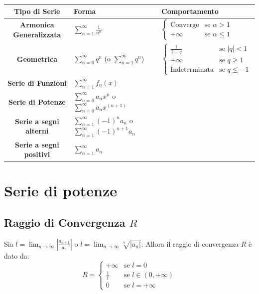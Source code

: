 \documentclass[10pt, a4paper]{article}
\begin{document}
    \begin{center}
        \begin{tabular}{|c|p{6cm}|p{5cm}|}
            \hline
            \textbf{Tipo di Serie} & \textbf{Forma} & \textbf{Comportamento} \\
            \hline
            \textbf{Armonica Generalizzata} & $\displaystyle \sum_{n=1}^{\infty}\frac{1}{n^\alpha}$ & 
                $\begin{cases}
                    \text{Converge} & \text{se }\alpha > 1 \\
                    +\infty & \text{se }\alpha \leq 1
                \end{cases}$ \\
            \hline
            \textbf{Geometrica} & $\displaystyle \sum_{n=0}^{\infty}q^n$ (o $\sum_{n=1}^{\infty}q^n$) & 
                $\begin{cases}
                    \frac{1}{1-q} & \text{se } |q|< 1 \\
                    +\infty & \text{se } q \geq 1 \\
                    \text{Indeterminata} & \text{se } q \leq -1
                \end{cases}$ \\
            \hline
            \textbf{Serie di Funzioni} & $\displaystyle \sum_{n=1}^{\infty}f_n(x)$ & \\
            \hline
            \textbf{Serie di Potenze} & $\displaystyle \sum_{n=0}^{\infty}a_n x^n$ o $\sum_{n=0}^{\infty}a_n x^{(n+1)}$ & \\
            \hline
            \textbf{Serie a segni alterni} & $\displaystyle\sum_{n=1}^{\infty}(-1)^n a_n$ o $\sum_{n=1}^{\infty}(-1)^{n+1} a_n$ & \\
            \hline
            \textbf{Serie a segni positivi} & $\displaystyle\sum_{n=1}^{\infty}a_n$ & \\
            \hline
        \end{tabular}
    \end{center}

\section{Serie di potenze}
    \subsection{Raggio di Convergenza $R$}
        Sia $l = \lim_{n\to\infty} \left|\frac{a_{n+1}}{a_n}\right|$ o $l = \lim_{n\to\infty} \sqrt[n]{|a_n|}$.
        Allora il raggio di convergenza $R$ è dato da:
        \begin{equation*}
            R=\begin{cases}
                +\infty & \text{se } l = 0\\
                \frac{1}{l} & \text{se } l \in (0,+\infty)\\
                0 & \text{se } l = +\infty
            \end{cases}
        \end{equation*}
\end{document}

